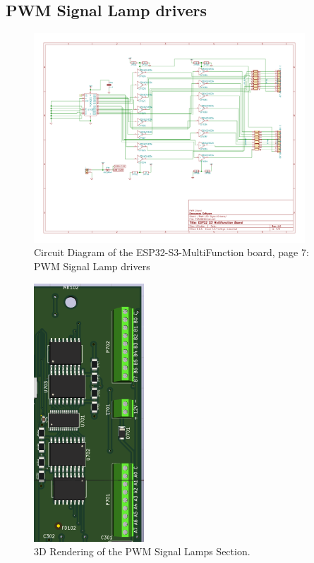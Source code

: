\subsection{PWM Signal Lamp drivers}
\begin{figure}[hbpt]\begin{centering}%
\includegraphics[width=4in]{ESP32-S3-MultiFunction-7.pdf}
\caption{Circuit Diagram of the ESP32-S3-MultiFunction board, page 7: PWM 
Signal Lamp drivers}
\end{centering}\end{figure}
\begin{figure}[hbpt]\begin{centering}%
\includegraphics{ESP32-S3-MultiFunction-top3D-PWMSignalLamps.png}
\caption{3D Rendering of the PWM Signal Lamps Section.}
\end{centering}\end{figure}


